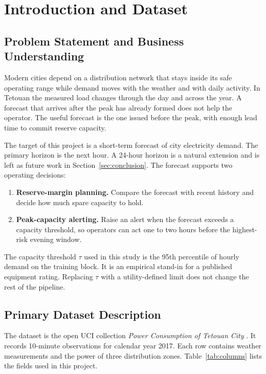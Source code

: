 \section{Introduction and Dataset}
\label{sec:introduction}

\subsection{Problem Statement and Business Understanding}
\label{sec:problem}

Modern cities depend on a distribution network that stays inside its safe
operating range while demand moves with the weather and with daily activity.
In Tetouan the measured load changes through the day and across the year.
A forecast that arrives after the peak has already formed does not help the
operator. The useful forecast is the one issued before the peak, with enough
lead time to commit reserve capacity.

The target of this project is a short-term forecast of city electricity
demand. The primary horizon is the next hour. A 24-hour horizon is a natural
extension and is left as future work in Section~\ref{sec:conclusion}. The
forecast supports two operating decisions:

\begin{enumerate}[label=(\arabic*), itemsep=2pt]
  \item \textbf{Reserve-margin planning.} Compare the forecast with recent
        history and decide how much spare capacity to hold.
  \item \textbf{Peak-capacity alerting.} Raise an alert when the forecast
        exceeds a capacity threshold, so operators can act one to two hours
        before the highest-risk evening window.
\end{enumerate}

The capacity threshold \(\tau\) used in this study is the 95th percentile of
hourly demand on the training block. It is an empirical stand-in for a
published equipment rating. Replacing \(\tau\) with a utility-defined limit
does not change the rest of the pipeline.

\subsection{Primary Dataset Description}
\label{sec:dataset}

The dataset is the open UCI collection \emph{Power Consumption of Tetouan
City} \cite{uci-tetouan, salam2018}. It records 10-minute observations for
calendar year 2017. Each row contains weather measurements and the power of
three distribution zones. Table~\ref{tab:columns} lists the fields used in
this project.

